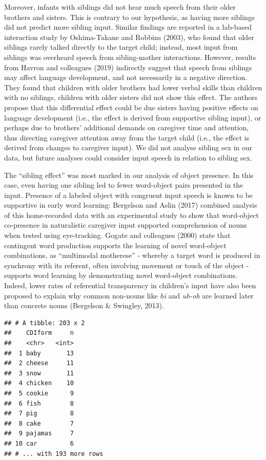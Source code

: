 \documentclass[
  english,
  man,floatsintext]{apa6}
\begin{document}
Moreover, infants with siblings did not hear much speech from their older brothers and sisters. This is contrary to our hypothesis, as having more siblings did not predict more sibling input. Similar findings are reported in a lab-based interaction study by Oshima-Takane and Robbins (2003), who found that older siblings rarely talked directly to the target child; instead, most input from siblings was overheard speech from sibling-mother interactions. However, results from Havron and colleagues (2019) indirectly suggest that speech from siblings may affect language development, and not necessarily in a negative direction. They found that children with older brothers had lower verbal skills than children with no siblings, children with older sisters did not show this effect. The authors propose that this differential effect could be due sisters having positive effects on language development (i.e., the effect is derived from supportive sibling input), or perhaps due to brothers' additional demands on caregiver time and attention, thus directing caregiver attention away from the target child (i.e., the effect is derived from changes to caregiver input). We did not analyse sibling sex in our data, but future analyses could consider input speech in relation to sibling sex.

The \enquote{sibling effect} was most marked in our analysis of object presence. In this case, even having one sibling led to fewer word-object pairs presented in the input. Presence of a labeled object with congruent input speech is known to be supportive in early word learning: Bergelson and Aslin (2017) combined analysis of this home-recorded data with an experimental study to show that word-object co-presence in naturalistic caregiver input supported comprehension of nouns when tested using eye-tracking. Gogate and colleagues (2000) state that contingent word production supports the learning of novel word-object combinations, as \enquote{multimodal motherese} - whereby a target word is produced in synchrony with its referent, often involving movement or touch of the object - supports word learning by demonstrating novel word-object combinations. Indeed, lower rates of referential transparency in children's input have also been proposed to explain why common non-nouns like \emph{hi} and \emph{uh-oh} are learned later than concrete nouns (Bergelson \& Swingley, 2013).

\begin{verbatim}
## # A tibble: 203 x 2
##    CDIform     n
##    <chr>   <int>
##  1 baby       13
##  2 cheese     11
##  3 snow       11
##  4 chicken    10
##  5 cookie      9
##  6 fish        8
##  7 pig         8
##  8 cake        7
##  9 pajamas     7
## 10 car         6
## # ... with 193 more rows
\end{verbatim}
\end{document}
